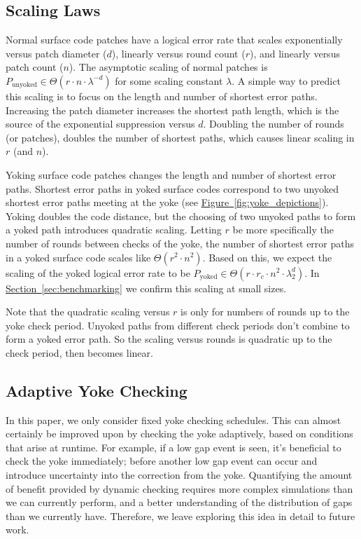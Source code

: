 \documentclass[onecolumn,unpublished,a4paper]{quantumarticle}
\theoremstyle{definition}
\theoremstyle{definition}
\theoremstyle{definition}
\renewcommand{\sec}[1]{\hyperref[sec:#1]{Section~\ref*{sec:#1}}}
\newcommand{\fig}[1]{\hyperref[fig:#1]{Figure~\ref*{fig:#1}}}
\begin{document}
\subsection{Scaling Laws}

Normal surface code patches have a logical error rate that scales exponentially versus patch diameter ($d$), linearly versus round count ($r$), and linearly versus patch count ($n$).
The asymptotic scaling of normal patches is $P_{\text{unyoked}} \in \Theta(r \cdot n \cdot \lambda^{-d})$ for some scaling constant $\lambda$.
A simple way to predict this scaling is to focus on the length and number of shortest error paths.
Increasing the patch diameter increases the shortest path length, which is the source of the exponential suppression versus $d$.
Doubling the number of rounds (or patches), doubles the number of shortest paths, which causes linear scaling in $r$ (and $n$).

Yoking surface code patches changes the length and number of shortest error paths.
Shortest error paths in yoked surface codes correspond to two unyoked shortest error paths meeting at the yoke (see \fig{yoke_depictions}).
Yoking doubles the code distance, but the choosing of two unyoked paths to form a yoked path introduces quadratic scaling.
Letting $r$ be more specifically the number of rounds between checks of the yoke, the number of shortest error paths in a yoked surface code scales like $\Theta(r^2 \cdot n^2)$.
Based on this, we expect the scaling of the yoked logical error rate to be $P_{\text{yoked}} \in \Theta(r \cdot r_c \cdot n^2 \cdot \lambda_2^d)$.
In \sec{benchmarking} we confirm this scaling at small sizes.

Note that the quadratic scaling versus $r$ is only for numbers of rounds up to the yoke check period.
Unyoked paths from different check periods don't combine to form a yoked error path.
So the scaling versus rounds is quadratic up to the check period, then becomes linear.

\subsection{Adaptive Yoke Checking}

In this paper, we only consider fixed yoke checking schedules.
This can almost certainly be improved upon by checking the yoke adaptively, based on conditions that arise at runtime.
For example, if a low gap event is seen, it's beneficial to check the yoke immediately; before another low gap event can occur and introduce uncertainty into the correction from the yoke.
Quantifying the amount of benefit provided by dynamic checking requires more complex simulations than we can currently perform, and a better understanding of the distribution of gaps than we currently have.
Therefore, we leave exploring this idea in detail to future work.
\end{document}
